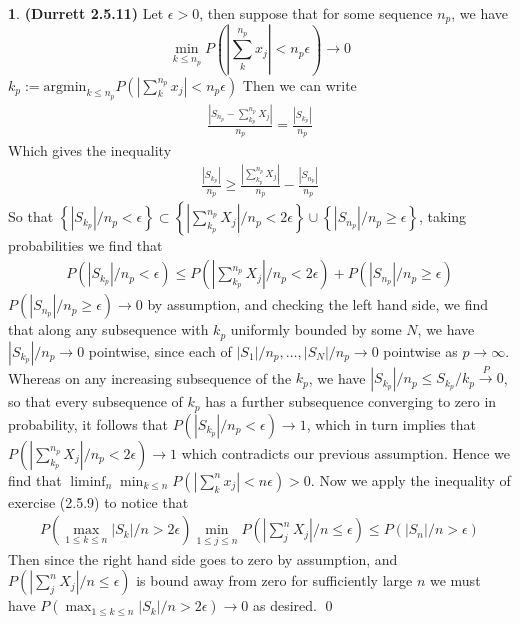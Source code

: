 \documentclass{article}
\theoremstyle{definition}
\newtheorem{pb}{}
\newcommand{\set}[1]{\left\{#1\right\}}
\newcommand{\abs}[1]{\left\vert#1\right\vert}
\begin{document}
    \begin{pb}\textbf{(Durrett 2.5.11)}
        Let \(\epsilon > 0\), then suppose that for some sequence \(n_p\), we have \[\min_{k \leq n_p}P\left(\abs{\sum_k^{n_p}x_j} < n_p \epsilon\right) \to 0\] \(k_p := \text{argmin}_{k\leq n_p}P\left(\abs{\sum_k^{n_p}x_j} < n_p \epsilon\right)\) Then we can write
        \begin{align*}
            \frac{\abs{S_{n_p}-\sum_{k_p}^{n_p}X_j}}{n_p} = \frac{\abs{S_{k_p}}}{n_p}
        \end{align*}
        Which gives the inequality
        \begin{align*}
            \frac{\abs{S_{k_p}}}{n_p} \geq \frac{\abs{\sum_{k_p}^{n_p}X_j}}{n_p} - \frac{\abs{S_{n_p}}}{n_p}
        \end{align*}
        So that \(\set{\abs{S_{k_p}}/n_p < \epsilon} \subset \set{\abs{\sum_{k_p}^{n_p}X_j}/n_p < 2 \epsilon} \cup \set{\abs{S_{n_p}}/n_p \geq \epsilon}\), taking probabilities we find that
        \begin{align*}
            P\left(\abs{S_{k_p}}/n_p < \epsilon\right) \leq P\left(\abs{\sum_{k_p}^{n_p}X_j}/n_p < 2 \epsilon\right) + P\left(\abs{S_{n_p}}/n_p \geq \epsilon\right)
        \end{align*}
        \(P\left(\abs{S_{n_p}}/n_p \geq \epsilon\right) \to 0\) by assumption, and checking the left hand side, we find that along any subsequence with \(k_p\) uniformly bounded by some \(N\), we have \(\abs{S_{k_p}}/n_p \to 0\) pointwise, since each of \(\abs{S_1}/n_p,\hdots,\abs{S_N}/n_p \to 0\) pointwise as \(p \to \infty\). Whereas on any increasing subsequence of the \(k_p\), we have \(\abs{S_{k_p}}/n_p \leq S_{k_p}/k_p \overset{P}{\to} 0\), so that every subsequence of \(k_p\) has a further subsequence converging to zero in probability, it follows that \(P\left(\abs{S_{k_p}}/n_p < \epsilon\right) \to 1\), which in turn implies that \(P\left(\abs{\sum_{k_p}^{n_p}X_j}/n_p < 2 \epsilon\right) \to 1\) which contradicts our previous assumption. Hence we find that \(\liminf_n \min_{k \leq n}P\left(\abs{\sum_k^{n}x_j} < n \epsilon\right) > 0\). Now we apply the inequality of exercise (2.5.9) to notice that
        \begin{align*}
            P\left(\max_{1\leq k\leq n}\abs{S_k}/n > 2 \epsilon\right)\min_{1 \leq j \leq n}P\left(\abs{\sum_j^n X_j}/n \leq \epsilon\right) \leq P\left(\abs{S_n}/n > \epsilon\right)
        \end{align*}
        Then since the right hand side goes to zero by assumption, and \(P\left(\abs{\sum_j^n X_j}/n \leq \epsilon\right)\) is bound away from zero for sufficiently large \(n\) we must have \(P\left(\max_{1\leq k\leq n}\abs{S_k}/n > 2 \epsilon\right) \to 0\) as desired. \qed
    \end{pb}
\end{document}
